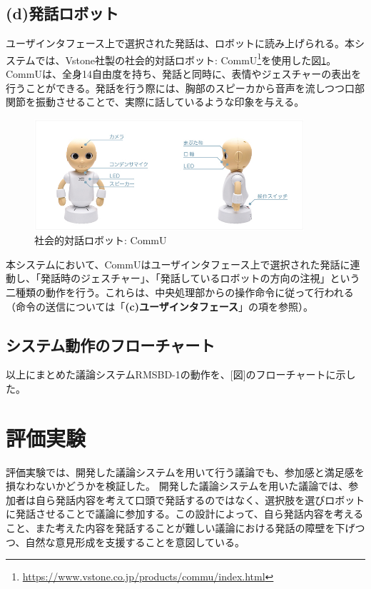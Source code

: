 \documentclass[11pt, a4paper]{jreport} %
\begin{document}
\subsection*{(d)発話ロボット}
ユーザインタフェース上で選択された発話は、ロボットに読み上げられる。本システムでは、Vstone社製の社会的対話ロボット: CommU\footnote{\url{https://www.vstone.co.jp/products/commu/index.html}}を使用した図\ref{fig:commU}。CommUは、全身14自由度を持ち、発話と同時に、表情やジェスチャーの表出を行うことができる。発話を行う際には、胸部のスピーカから音声を流しつつ口部関節を振動させることで、実際に話しているような印象を与える。

\begin{figure}[htbp]
\begin{center}
\includegraphics[width=100mm]{images/150929_banner-08s.jpg}
\caption{社会的対話ロボット: CommU}
\label{fig:commU}
\end{center}
\end{figure}



本システムにおいて、CommUはユーザインタフェース上で選択された発話に連動し、「発話時のジェスチャー」、「発話しているロボットの方向の注視」という二種類の動作を行う。これらは、中央処理部からの操作命令に従って行われる（命令の送信については「\textbf{(c)ユーザインタフェース}」の項を参照）。


\subsection{システム動作のフローチャート}
以上にまとめた議論システムRMSBD-1の動作を、[図]のフローチャートに示した。


\section{評価実験}
\label{sec:実験1}
評価実験では、開発した議論システムを用いて行う議論でも、参加感と満足感を損なわないかどうかを検証した。
開発した議論システムを用いた議論では、参加者は自ら発話内容を考えて口頭で発話するのではなく、選択肢を選びロボットに発話させることで議論に参加する。この設計によって、自ら発話内容を考えること、また考えた内容を発話することが難しい議論における発話の障壁を下げつつ、自然な意見形成を支援することを意図している。
\end{document}
